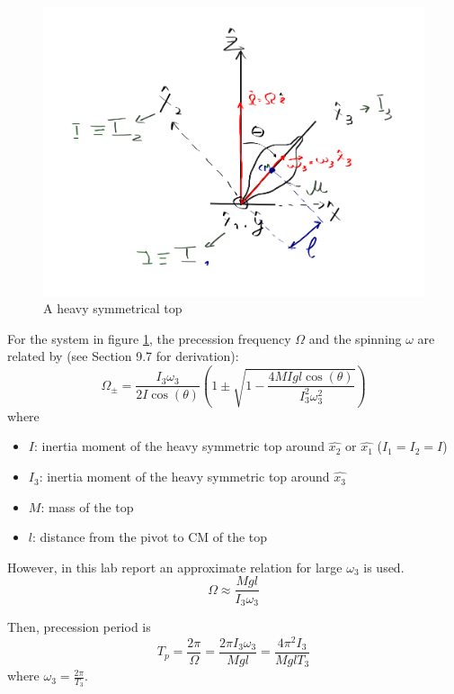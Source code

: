 \begin{figure}[H]
  \centering
  \includegraphics[width=\columnwidth]{gyroscope/images/top}
  \caption{A heavy symmetrical top}
  \label{fig:theory:top}
\end{figure}

For the system in figure \ref{fig:theory:top}, the precession frequency $\Omega$ and the spinning $\omega$ are related by (see Section 9.7 \cite{1} for derivation):
\begin{equation*}
  \Omega_{\pm} = \frac{I_{3}\omega_3}{2I\cos(\theta)} \left( 1 \pm \sqrt{1 - \frac{4MIgl\cos(\theta)}{I_{3}^{2} \omega_{3}^{2}}}  \right)
\end{equation*}
where
\begin{itemize}
\item $I$: inertia moment of the heavy symmetric top around $\hat{x_{2}}$ or $\hat{x_{1}}$ ($I_{1} = I_{2} = I$)
\item $I_{3}$: inertia moment of the heavy symmetric top around $\hat{x_{3}}$
\item $M$: mass of the top
\item $l$: distance from the pivot to CM of the top
\end{itemize}

However, in this lab report an approximate relation for large $\omega_{3}$ is used.
\begin{equation}
  \label{eq:theory:precession_frequency}
  \Omega \approx \frac{Mgl}{I_{3}\omega_{3}}
\end{equation}

Then, precession period is
\begin{equation}
  \label{eq:theory:precession_period}
  T_{p} = \frac{2\pi}{\Omega} = \frac{2\pi I_{3} \omega_3}{Mgl} = \frac{4\pi^{2} I_{3}}{MglT_{3}}
\end{equation}
where $\omega_{3} = \frac{2\pi}{T_{3}}$.

